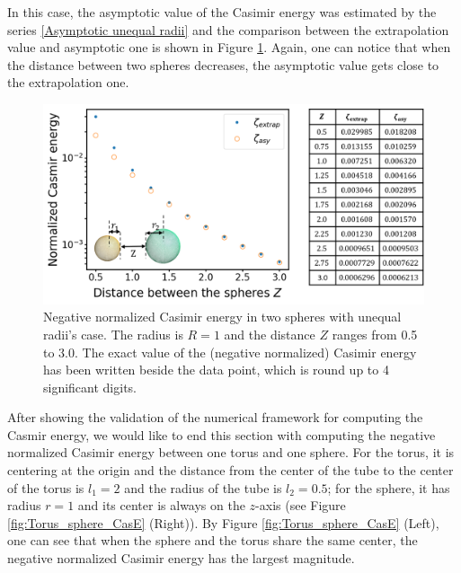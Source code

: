 In this case, the asymptotic value of the Casimir 
energy was estimated by the series \eqref{Asymptotic unequal radii} and the comparison between the extrapolation value and asymptotic one is shown in Figure 
\ref{Casimir energy between spheres with unequal radii}. Again, one can notice that when the distance between two spheres decreases, the asymptotic value gets 
close to the extrapolation one.
\begin{figure}[H]
    \centering
    \includegraphics[width = \textwidth]{figures/Spheres_unequal_CasE.png}
    \caption{Negative normalized Casimir energy in two spheres with unequal radii's case. The radius is $R = 1$ and the distance $Z$ 
    ranges from 0.5 to 3.0. The exact value of the (negative normalized) Casimir energy has been written 
    beside the data point, which is round up to 4 significant digits.}
    \label{Casimir energy between spheres with unequal radii}
\end{figure}

After showing the validation of the numerical framework for computing the Casmir energy, we would like to end this section with computing the negative normalized Casimir energy between one torus and one sphere. For the torus, it is centering at the origin and the distance from the center of the tube to the center of the torus is $l_1 = 2$ and the radius of the tube is $l_2 = 0.5$; for the sphere, 
it has radius $r = 1$ and its center is always on the $z$-axis (see Figure \ref{fig:Torus_sphere_CasE} (Right)). By  Figure \ref{fig:Torus_sphere_CasE} (Left), one can see that when the sphere and the torus share the same center, the negative normalized Casimir energy has the largest magnitude. 



